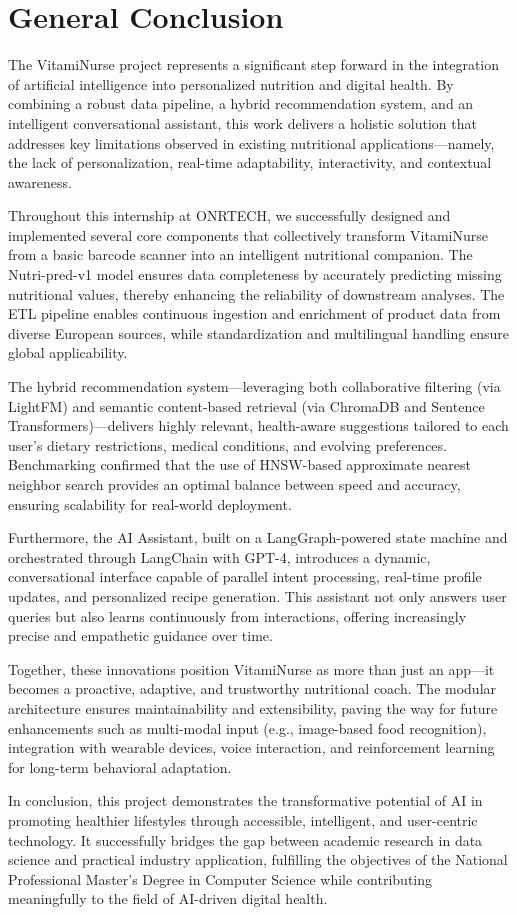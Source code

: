 \newpage
\section*{General Conclusion}
The VitamiNurse project represents a significant step forward in the integration of artificial intelligence into personalized nutrition and digital health. By combining a robust data pipeline, a hybrid recommendation system, and an intelligent conversational assistant, this work delivers a holistic solution that addresses key limitations observed in existing nutritional applications—namely, the lack of personalization, real-time adaptability, interactivity, and contextual awareness. 

Throughout this internship at ONRTECH, we successfully designed and implemented several core components that collectively transform VitamiNurse from a basic barcode scanner into an intelligent nutritional companion. The Nutri-pred-v1 model ensures data completeness by accurately predicting missing nutritional values, thereby enhancing the reliability of downstream analyses. The ETL pipeline enables continuous ingestion and enrichment of product data from diverse European sources, while standardization and multilingual handling ensure global applicability. 

The hybrid recommendation system—leveraging both collaborative filtering (via LightFM) and semantic content-based retrieval (via ChromaDB and Sentence Transformers)—delivers highly relevant, health-aware suggestions tailored to each user’s dietary restrictions, medical conditions, and evolving preferences. Benchmarking confirmed that the use of HNSW-based approximate nearest neighbor search provides an optimal balance between speed and accuracy, ensuring scalability for real-world deployment. 

Furthermore, the AI Assistant, built on a LangGraph-powered state machine and orchestrated through LangChain with GPT-4, introduces a dynamic, conversational interface capable of parallel intent processing, real-time profile updates, and personalized recipe generation. This assistant not only answers user queries but also learns continuously from interactions, offering increasingly precise and empathetic guidance over time. 

Together, these innovations position VitamiNurse as more than just an app—it becomes a proactive, adaptive, and trustworthy nutritional coach. The modular architecture ensures maintainability and extensibility, paving the way for future enhancements such as multi-modal input (e.g., image-based food recognition), integration with wearable devices, voice interaction, and reinforcement learning for long-term behavioral adaptation. 

In conclusion, this project demonstrates the transformative potential of AI in promoting healthier lifestyles through accessible, intelligent, and user-centric technology. It successfully bridges the gap between academic research in data science and practical industry application, fulfilling the objectives of the National Professional Master’s Degree in Computer Science while contributing meaningfully to the field of AI-driven digital health. 
 